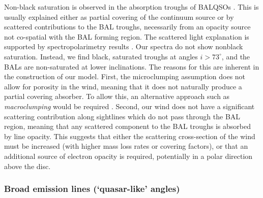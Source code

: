 \documentclass[useAMS,usenatbib]{mn2e_x}
\begin{document}
Non-black saturation is observed in the absorption troughs of BALQSOs \citep{arav1999b,arav1999a}.
This is usually explained either as  partial covering of the continuum
source or by scattered contributions to the BAL troughs, necessarily
from an opacity source not co-spatial with the BAL forming region.
The scattered light explanation is supported by spectropolarimetry results
\citep{lamy2000}. Our spectra do not show nonblack saturation.
Instead, we find black, saturated troughs at angles $i > 73^\circ$, and the BALs
are non-saturated at lower inclinations. The reasons for this are inherent in the construction of our model. 
First, the microclumping assumption does not allow for 
porosity in the wind, meaning that it does not naturally produce
a partial covering absorber. To allow this, an alternative approach
such as {\em macroclumping} would be required \citep[e.g.][]{hamann2008,surlan2012}.
Second, our wind does not have a significant scattering 
contribution along sightlines which do not pass through the BAL region,
meaning that any scattered component to the BAL troughs is absorbed by line opacity.
This suggests that either the scattering cross-section of the wind must
be increased (with higher mass loss rates or covering factors), or 
that an additional source of electron opacity is required, potentially
in a polar direction above the disc.  


\subsubsection{Broad emission lines (`quasar-like' angles)}
\end{document}
